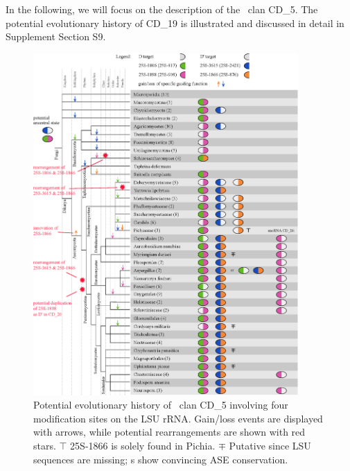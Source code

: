 In the following, we will focus on the description of the \sno\ clan
CD\_5. The potential evolutionary history of CD\_19 is illustrated and
discussed in detail in Supplement Section S9.

\begin{figure}
  \centering
  \includegraphics[width=0.9\textwidth]{pics/target_switches_CD_5.eps}
  \caption[Potential evolutionary history of \sno\ clan
  CD\_5.]{Potential evolutionary history of \sno\ clan CD\_5 involving
    four modification sites on the LSU rRNA. Gain/loss events are
    displayed with arrows, while potential rearrangements are shown
    with red stars. $\top$ 25S-1866 is solely found in Pichia. $\mp$
    Putative since LSU sequences are missing; \sno s show convincing
    ASE conservation.}
  \label{fig:CD_5}
\end{figure}

